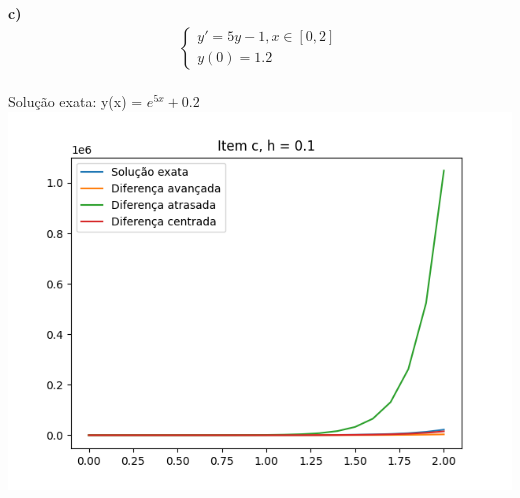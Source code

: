         \\
        \\
        \textbf{c)}
    \begin{align*}
    \begin{cases}
        y' = 5y - 1, x \in [0, 2] \\
        y(0) = 1.2
    \end{cases}
    \end{align*}
    \\
    Solução exata: y(x) = $e^{5x} + 0.2$\\\includegraphics{c_h_0.1.png}
        \\

